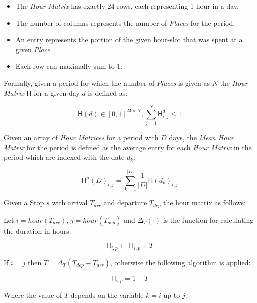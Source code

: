 \begin{itemize}
    \item The \textit{Hour Matrix} has exactly 24 rows, each representing 1 hour in a day.
    \item The number of columns represents the number of \textit{Places} for the period. 
    \item An entry represents the portion of the given hour-slot that was spent at a given \textit{Place}.
    \item Each row can maximally sum to 1.
\end{itemize}

Formally, given a period for which the number of \textit{Places} is given as $N$ the \textit{Hour Matrix} $\mathsf{H}$ for a given day $d$ is defined as:

\begin{equation}
\label{eq:feature-hour-matrix-def}
\mathsf{H}(d) \in [0,1]^{24 \times N}, \sum_{j=1}^N \mathsf{H}^d_{i,j} \leq 1
\end{equation}

Given an array of \textit{Hour Matrices} for a period with $D$ days, the \textit{Mean Hour Matrix} for the period is defined as the average entry for each \textit{Hour Matrix} in the period which are indexed with the date $d_k$:

\begin{equation}
\label{eq:feature-hour-matrix-mean}
\mathsf{H}^{\mu} (D) _{i,j} = \sum_{k=1}^{|D|} \frac{1}{|D|} \mathsf{H}(d_k)_{i,j}
\end{equation}

Given a Stop $s$ with arrival $T_{arr}$ and departure $T_{dep}$ the hour matrix as follows:

Let $i = hour(T_{arr})$, $j = hour(T_{dep})$ and $\Delta_ T(\cdot)$ is the function for calculating the duration in hours.

\begin{equation}
\label{eq:feature-hour-matrix-computation}
\mathsf{H}_{i,p} \leftarrow \mathsf{H}_{i,p} + T
\end{equation}

If $i = j$ then $T = \Delta_T (T_{dep} - T_{arr})$, otherwise the following algorithm is applied:

\begin{equation}
\label{eq:feature-hour-computaion2}
\mathsf{H}_{i,p} = 1 - T
\end{equation}

Where the value of $T$ depends on the variable $k = i$ up to $j$:

